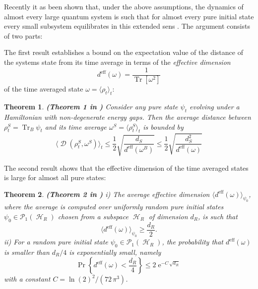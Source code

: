 \documentclass[aps,prl,twocolumn,showpacs,showkeys,a4paper]{revtex4}
\newtheorem{theorem}{Theorem}
\DeclareMathOperator{\Tr}{\mathrm{Tr}}%
\DeclareMathOperator{\probability}{\mathrm{Pr}}%
\DeclareMathOperator{\tracedistance}{\mathcal{D}}
\DeclareMathOperator{\ee}{\mathrm{e}}%
\DeclareMathOperator{\hiH}{\mathcal{H}}%
\newcommand{\expect}[1]{\langle #1\rangle}
\begin{document}
Recently it as been shown that, under the above assumptions, the dynamics of almost every large quantum system is such that for almost every pure initial state every small subsystem equilibrates in this extended sens \cite{Linden09,Reimann08}.
The argument consists of two parts:

The first result establishes a bound on the expectation value of the distance of the systems state from its time average in terms of the \emph{effective dimension}
\begin{equation}
  d^{\mathrm{eff}}(\omega) = \frac{1}{\Tr[\omega^2]}
\end{equation}
of the time averaged state $\omega = \expect{\rho_t}_t$:
\begin{theorem}
  \label{theorem:distancefromtimeaverage}
  {\bf (Theorem 1 in \cite{Linden09})}
  Consider any pure state $\psi_t$ evolving under a Hamiltonian with non-degenerate energy gaps.
  Then the average distance between $\rho^S_t = \Tr_B\psi_t$ and its time average $\omega^S = \expect{\rho^S_t}_t$ is bounded by
  \begin{equation}
    \expect{\tracedistance(\rho^S_t,\omega^S)}_t \leq \frac{1}{2} \sqrt{\frac{d_S}{d^\mathrm{eff}(\omega^B)}} \leq \frac{1}{2} \sqrt{\frac{d_S^2}{d^\mathrm{eff}(\omega)}}
  \end{equation}
\end{theorem}

The second result shows that the effective dimension of the time averaged states is large for almost all pure states:
\begin{theorem}
  \label{theorem:highaveragedeffectivedimensionisgeneric}
  {\bf (Theorem 2 in \cite{Linden09})}
  i) The average effective dimension $\expect{d^{\mathrm{eff}}(\omega)}_{\psi_0}$, where the average is computed over uniformly random pure initial states $\psi_0 \in \mathcal{P}_1(\hiH_R)$ chosen from a subspace $\hiH_R$ of dimension $d_R$, is such that
  \begin{equation}
    \expect{d^{\mathrm{eff}}(\omega)}_{\psi_0} \geq \frac{d_R}{2} .
  \end{equation}
  ii) For a random pure initial state $\psi_0 \in \mathcal{P}_1(\hiH_R)$, the probability that $d^{\mathrm{eff}}(\omega)$ is smaller than $d_R/4$ is exponentially small, namely
  \begin{equation}
    \probability\left\{d^{\mathrm{eff}}(\omega) < \frac{d_R}{4}\right\} \leq 2 \ee^{-C\,\sqrt{d_R}}
  \end{equation}
  with a constant $C = \ln(2)^2/(72\,\pi^3)$.
\end{theorem}
\end{document}
